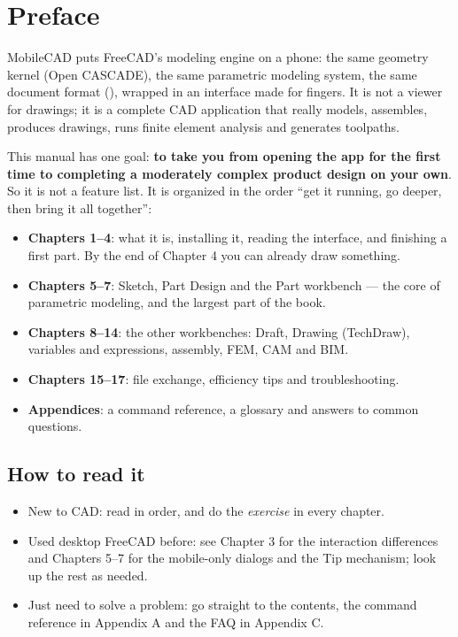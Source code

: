 \chapter*{Preface}

MobileCAD puts FreeCAD's modeling engine on a phone: the same geometry kernel (Open CASCADE), the same
parametric modeling system, the same document format (), wrapped in an interface made for
fingers. It is not a viewer for drawings; it is a complete CAD application that really models, assembles,
produces drawings, runs finite element analysis and generates toolpaths.

This manual has one goal: \textbf{to take you from opening the app for the first time to completing a
moderately complex product design on your own}. So it is not a feature list. It is organized in the order
“get it running, go deeper, then bring it all together”:

\begin{itemize}
  \item \textbf{Chapters 1--4}: what it is, installing it, reading the interface, and finishing a first part.
        By the end of Chapter 4 you can already draw something.
  \item \textbf{Chapters 5--7}: Sketch, Part Design and the Part workbench — the core of parametric modeling,
        and the largest part of the book.
  \item \textbf{Chapters 8--14}: the other workbenches: Draft, Drawing (TechDraw), variables and expressions,
        assembly, FEM, CAM and BIM.
  \item \textbf{Chapters 15--17}: file exchange, efficiency tips and troubleshooting.
  \item \textbf{Appendices}: a command reference, a glossary and answers to common questions.
\end{itemize}

\section*{How to read it}
\begin{itemize}
  \item New to CAD: read in order, and do the \emph{exercise} in every chapter.
  \item Used desktop FreeCAD before: see Chapter 3 for the interaction differences and Chapters 5--7 for the
        mobile-only dialogs and the Tip mechanism; look up the rest as needed.
  \item Just need to solve a problem: go straight to the contents, the command reference in Appendix A and
        the FAQ in Appendix C.
\end{itemize}

